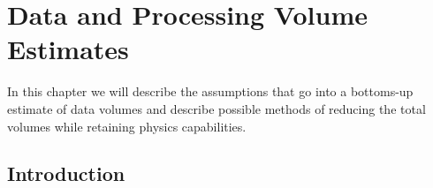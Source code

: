 \documentclass[../main-00.tex]{subfiles}
\begin{document}
\chapter{Data and Processing Volume Estimates }
\label{ch:est}
In this chapter we will describe the assumptions that go into a bottoms-up estimate of data volumes and describe possible methods of reducing the total volumes while retaining physics capabilities. 

\section{Introduction}







\end{document}
